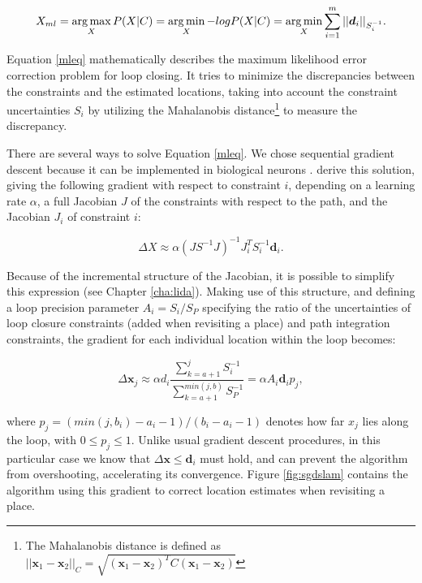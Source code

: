 \begin{equation}
\label{mleq}
X_{ml} = \operatorname*{arg\,max}_X P(X|C) = \operatorname*{arg\,min}_X -log P(X|C) = \operatorname*{arg\,min}_X \sum_{i=1}^{m} ||\bm d_i||_{S_i^{-1}}.
\end{equation}

Equation \ref{mleq} mathematically describes the maximum likelihood error correction problem for loop closing. It tries to minimize the discrepancies between the constraints and the estimated locations, taking into account the constraint uncertainties $S_i$ by utilizing the Mahalanobis distance\footnote{The Mahalanobis distance is defined as $||\bm x_1-\bm x_2||_C = \sqrt{(\bm x_1-\bm x_2)^TC(\bm x_1-\bm x_2)}$} to measure the discrepancy.

There are several ways to solve Equation \ref{mleq}. We chose sequential gradient descent because it can be implemented in biological neurons \citep{bengio2015towards}. \citep{olson2006fast} derive this solution, giving the following gradient with respect to constraint $i$, depending on a learning rate $\alpha$, a full Jacobian $J$ of the constraints with respect to the path, and the Jacobian $J_i$ of constraint $i$:

\begin{equation}
\label{gradient}
\Delta X \approx \alpha (JS^{-1}J)^{-1}J_i^TS_i^{-1} \bm d_i.
\end{equation}

Because of the incremental structure of the Jacobian, it is possible to simplify this expression (see Chapter \ref{cha:lida}). Making use of this structure, and defining a loop precision parameter $A_i=S_i/S_P$ specifying the ratio of the uncertainties of loop closure constraints (added when revisiting a place) and path integration constraints, the gradient for each individual location within the loop becomes:

\begin{equation}
\label{correction}
\Delta \bm x_j \approx \alpha d_i \frac{\sum_{k=a+1}^{j} S_i^{-1}}{\sum_{k=a+1}^{min(j,b)} S_P^{-1}} = \alpha A_i \bm d_i p_j,
\end{equation}

where $p_j=(min(j,b_i)-a_i-1)/(b_i-a_i-1)$ denotes how far $x_j$ lies along the loop, with $0 \leq p_j \leq 1$. Unlike usual gradient descent procedures, in this particular case we know that $\Delta \bm x \leq \bm d_i $ must hold, and can prevent the algorithm from overshooting, accelerating its convergence. Figure \ref{fig:sgdslam} contains the algorithm using this gradient to correct location estimates when revisiting a place.

